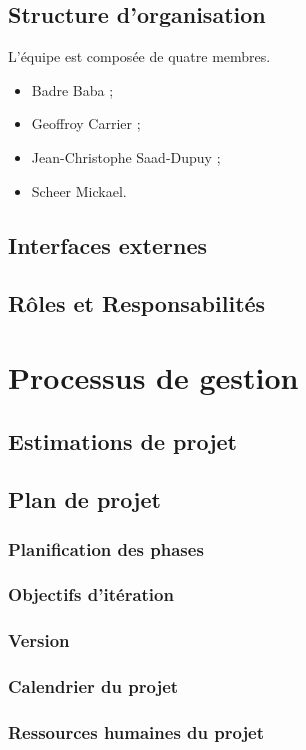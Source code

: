 \documentclass[a4paper,10pt,twoside]{article}
\begin{document}
\subsection{Structure d’organisation}
L'équipe est composée de quatre membres.
\begin{itemize}
	\item Badre Baba ;
	\item Geoffroy Carrier ;
	\item Jean-Christophe Saad-Dupuy ;
	\item Scheer Mickael.
\end{itemize}

\subsection{Interfaces externes}
\subsection{Rôles et Responsabilités}
\section{Processus de gestion}
\subsection{Estimations de projet}
\subsection{Plan de projet}
\subsubsection{Planification des phases}
\subsubsection{Objectifs d’itération}
\subsubsection{Version}
\subsubsection{Calendrier du projet}
\subsubsection{Ressources humaines du projet}
\end{document}
